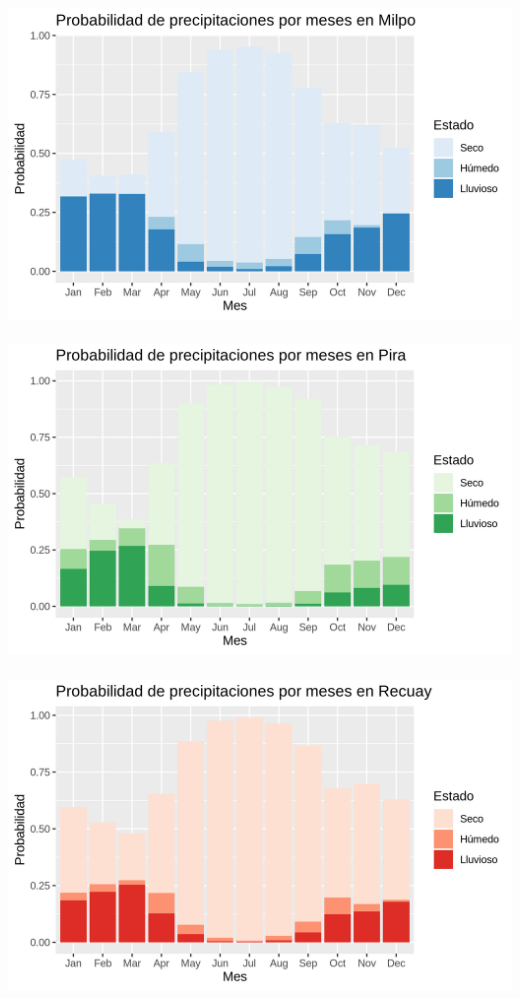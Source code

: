 \documentclass{article}
\begin{document}
\includegraphics[width=\textwidth]{milpo.png}\\\\
\includegraphics[width=\textwidth]{pira.png}\\\\
\includegraphics[width=\textwidth]{recuay.png}\\\\
\end{document}
